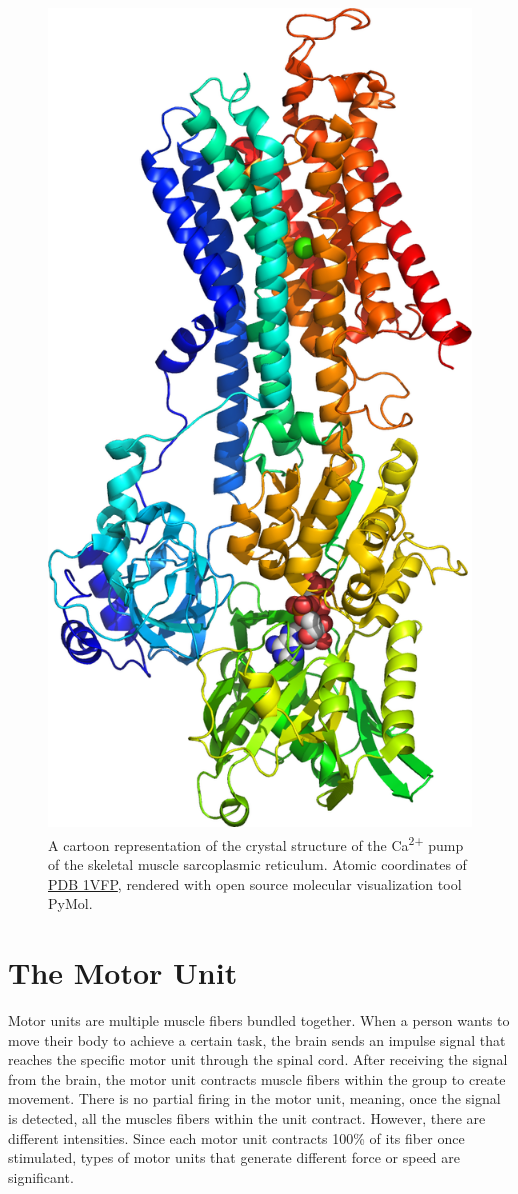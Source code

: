 \begin{figure}

{\centering \includegraphics[width=0.7\linewidth]{./figures/motor/Ca_pump} 

}

\caption{A cartoon representation of the crystal structure of the Ca\textsuperscript{2+} pump of the skeletal muscle sarcoplasmic reticulum. Atomic coordinates of \href{https://www.rcsb.org/structure/1VFP}{PDB 1VFP}, rendered with open source molecular visualization tool PyMol.}\label{fig:sercastructure}
\end{figure}

\hypertarget{the-motor-unit}{%
\section{The Motor Unit}\label{the-motor-unit}}

Motor units are multiple muscle fibers bundled together. When a person wants to move their body to achieve a certain task, the brain sends an impulse signal that reaches the specific motor unit through the spinal cord. After receiving the signal from the brain, the motor unit contracts muscle fibers within the group to create movement. There is no partial firing in the motor unit, meaning, once the signal is detected, all the muscles fibers within the unit contract. However, there are different intensities. Since each motor unit contracts 100\% of its fiber once stimulated, types of motor units that generate different force or speed are significant.

